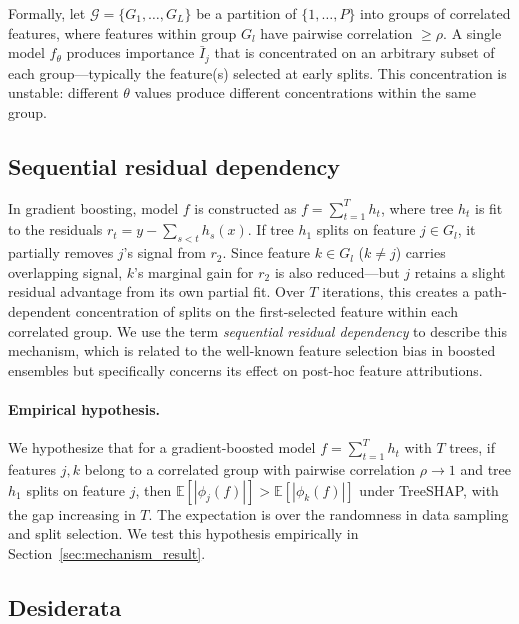 \documentclass[11pt]{article}
\newcommand{\rhovar}{\rho}
\begin{document}
Formally, let $\mathcal{G} = \{G_1, \ldots, G_L\}$ be a partition of
$\{1, \ldots, P\}$ into groups of correlated features, where features
within group $G_l$ have pairwise correlation $\geq \rhovar$. A single
model $f_\theta$ produces importance $\bar{I}_j$ that is concentrated on
an arbitrary subset of each group---typically the feature(s) selected at
early splits. This concentration is unstable: different $\theta$ values
produce different concentrations within the same group.

\subsection{Sequential residual dependency}

In gradient boosting, model $f$ is constructed as $f =
\sum_{t=1}^{T} h_t$, where tree $h_t$ is fit to the residuals
$r_t = y - \sum_{s<t} h_s(x)$. If tree $h_1$ splits on feature $j \in
G_l$, it partially removes $j$'s signal from $r_2$. Since feature $k
\in G_l$ ($k \neq j$) carries overlapping signal, $k$'s marginal gain
for $r_2$ is also reduced---but $j$ retains a slight residual advantage
from its own partial fit. Over $T$ iterations, this creates a
path-dependent concentration of splits on the first-selected feature
within each correlated group. We use the term \emph{sequential residual
dependency} to describe this mechanism, which is related to the
well-known feature selection bias in boosted ensembles but specifically
concerns its effect on post-hoc feature attributions.

\paragraph{Empirical hypothesis.}
We hypothesize that for a gradient-boosted model $f = \sum_{t=1}^{T} h_t$
with $T$ trees, if features $j, k$ belong to a correlated group with
pairwise correlation $\rhovar \to 1$ and tree $h_1$ splits on feature
$j$, then $\mathbb{E}[|\phi_j(f)|] > \mathbb{E}[|\phi_k(f)|]$ under
TreeSHAP, with the gap increasing in $T$. The expectation is over the
randomness in data sampling and split selection. We test this hypothesis
empirically in Section~\ref{sec:mechanism_result}.

\subsection{Desiderata}
\end{document}
